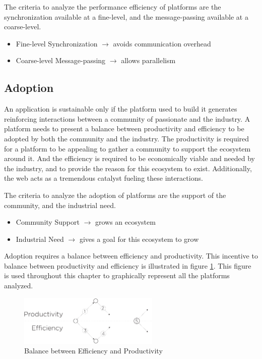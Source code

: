 \separator

The criteria to analyze the performance efficiency of platforms are the synchronization available at a fine-level, and the message-passing available at a coarse-level.

\begin{itemize}
\item Fine-level Synchronization
  \subitem $\to$ avoids communication overhead
\item Coarse-level Message-passing
  \subitem $\to$ allows parallelism
\end{itemize}

\subsection{Adoption} \label{chapter3:definitions:adoption}

An application is sustainable only if the platform used to build it generates reinforcing interactions between a community of passionate and the industry.
A platform needs to present a balance between productivity and efficiency to be adopted by both the community and the industry.
The productivity is required for a platform to be appealing to gather a community to support the ecosystem around it.
And the efficiency is required to be economically viable and needed by the industry, and to provide the reason for this ecosystem to exist.
Additionally, the web acts as a tremendous catalyst fueling these interactions.

\separator

The criteria to analyze the adoption of platforms are the support of the community, and the industrial need.

\begin{itemize}
\item Community Support
  \subitem $\to$ grows an ecosystem
\item Industrial Need
  \subitem $\to$ gives a goal for this ecosystem to grow
\end{itemize}

\separator

Adoption requires a balance between efficiency and productivity.
This incentive to balance between productivity and efficiency is illustrated in figure \ref{fig:state-of-the-art}.
This figure is used throughout this chapter to graphically represent all the platforms analyzed.

\begin{figure}[h!]
\begin{center}
\includegraphics[width=0.6\textwidth]{../resources/state-of-the-art.pdf}
\end{center}
\caption{Balance between Efficiency and Productivity}
\label{fig:state-of-the-art}
\end{figure}